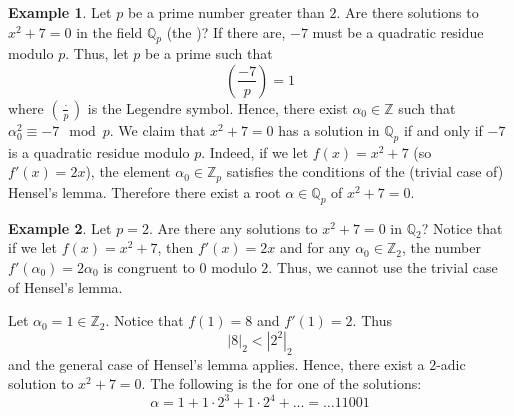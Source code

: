 \documentclass[12pt]{article}
\theoremstyle{definition}
\newtheorem{exa}{Example}
\newcommand{\Ints}{\mathbb{Z}}
\newcommand{\Rats}{\mathbb{Q}}
\begin{document}
\begin{exa}
Let $p$ be a prime number greater than $2$. Are there solutions to $x^2+7=0$ in the field $\Rats_p$ (the )? If there are, $-7$ must be a quadratic residue modulo $p$. Thus, let $p$ be a prime such that 
$$\left( \frac{-7}{p} \right)=1$$
where $( \frac{\cdot}{p} )$ is the Legendre symbol. Hence, there exist $\alpha_0\in \Ints$ such that $\alpha_0^2\equiv -7 \mod p$. We claim that $x^2+7=0$ has a solution in $\Rats_p$ if and only if $-7$ is a quadratic residue modulo $p$. Indeed, if we let $f(x)=x^2+7$ (so $f'(x)=2x$), the element $\alpha_0\in \Ints_p$ satisfies the conditions of the (trivial case of) Hensel's lemma. Therefore there exist a root $\alpha\in \Rats_p$ of $x^2+7=0$. \\
\end{exa}

\begin{exa}
Let $p=2$. Are there any solutions to $x^2+7=0$ in $\Rats_2$? Notice that if we let $f(x)=x^2+7$, then $f'(x)=2x$ and for any $\alpha_0\in \Ints_2$, the number $f'(\alpha_0)=2\alpha_0$ is congruent to $0$ modulo $2$. Thus, we cannot use the trivial case of Hensel's lemma.

Let $\alpha_0=1\in \Ints_2$. Notice that $f(1)=8$ and $f'(1)=2$. Thus
$$|8|_2<|2^2|_2$$
and the general case of Hensel's lemma applies. Hence, there exist a $2$-adic solution to $x^2+7=0$. The following is the  for one of the solutions:
$$\alpha=1+1\cdot 2^3+1\cdot 2^4 +\ldots=\ldots 11001$$
\end{exa}
\end{document}
